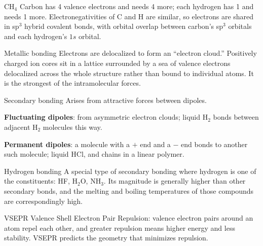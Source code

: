 \documentclass[11pt]{article}
\begin{document}
\begin{worked}{CH$_4$}
Carbon has 4 valence electrons and needs 4 more; each hydrogen has 1 and needs 1
more. Electronegativities of C and H are similar, so electrons are shared in
sp$^3$ hybrid covalent bonds, with orbital overlap between carbon's sp$^3$
orbitals and each hydrogen's $1s$ orbital. 
\end{worked}


\begin{keydef}{Metallic bonding}
Electrons are delocalized to form an ``electron cloud.'' Positively charged ion
cores sit in a lattice surrounded by a sea of valence electrons delocalized
across the whole structure rather than bound to individual atoms. It is the
strongest of the intramolecular forces.
\end{keydef}


\begin{keydef}{Secondary bonding}
Arises from attractive forces between dipoles.
\begin{points}
\item \textbf{Fluctuating dipoles}: from asymmetric electron clouds; liquid
H$_2$ bonds between adjacent H$_2$ molecules this way.
\item \textbf{Permanent dipoles}: a molecule with a $+$ end and a $-$ end bonds
to another such molecule; liquid HCl, and chains in a linear polymer.
\end{points}
\end{keydef}

\begin{keydef}{Hydrogen bonding}
A special type of secondary bonding where hydrogen is one of the constituents:
HF, H$_2$O, NH$_3$. Its magnitude is generally higher than other secondary
bonds, and the melting and boiling temperatures of those compounds are
correspondingly high. 
\end{keydef}


\begin{keydef}{VSEPR}
Valence Shell Electron Pair Repulsion: valence electron pairs around an atom
repel each other, and greater repulsion means higher energy and less stability.
VSEPR predicts the geometry that minimizes repulsion.
\end{keydef}
\end{document}

